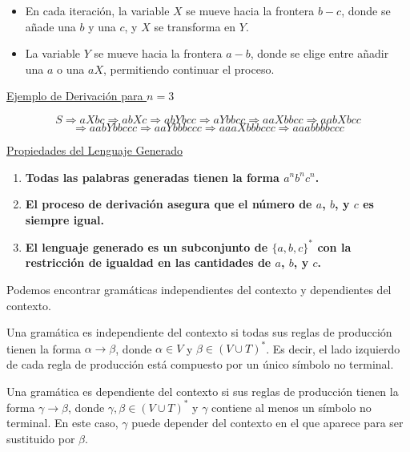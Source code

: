 \documentclass[12pt]{book} %
\providecommand{\tightlist}{%
  \setlength{\itemsep}{0pt}\setlength{\parskip}{0pt}}
\begin{document}
\begin{enumerate}
  \begin{itemize}
  \tightlist
  \item
    En cada iteración, la variable \(X\) se mueve hacia la frontera
    \(b-c\), donde se añade una \(b\) y una \(c\), y \(X\) se transforma
    en \(Y\).\\
  \item
    La variable \(Y\) se mueve hacia la frontera \(a-b\), donde se elige
    entre añadir una \(a\) o una \(aX\), permitiendo continuar el
    proceso.
  \end{itemize}
\end{enumerate}

\underline{Ejemplo de Derivación para $n = 3$}

\[
S \Rightarrow aXbc \Rightarrow abXc \Rightarrow abYbcc \Rightarrow aYbbcc \Rightarrow aaXbbcc \Rightarrow aabXbcc 
\] \[
\Rightarrow aabYbbccc \Rightarrow aaYbbbccc \Rightarrow aaaXbbbccc \Rightarrow aaabbbbccc
\]

\underline{Propiedades del Lenguaje Generado}

\begin{enumerate}
\def\labelenumi{\arabic{enumi}.}
\tightlist
\item
  \textbf{Todas las palabras generadas tienen la forma
  \(a^n b^n c^n\).}\\
\item
  \textbf{El proceso de derivación asegura que el número de \(a\),
  \(b\), y \(c\) es siempre igual.}\\
\item
  \textbf{El lenguaje generado es un subconjunto de \(\{a, b, c\}^*\)
  con la restricción de igualdad en las cantidades de \(a\), \(b\), y
  \(c\).}
\end{enumerate}

Podemos encontrar gramáticas independientes del contexto y dependientes
del contexto.

\begin{definicion}
Una gramática es independiente del contexto si todas sus reglas de producción tienen la forma $\alpha \to \beta$, donde $\alpha \in V$ y $\beta \in (V \cup T)^*$. Es decir, el lado izquierdo de cada regla de producción está compuesto por un único símbolo no terminal.
\end{definicion}

\begin{definicion}
Una gramática es dependiente del contexto si sus reglas de producción tienen la forma $\gamma \to \beta$, donde $\gamma, \beta \in (V \cup T)^*$ y $\gamma$ contiene al menos un símbolo no terminal. En este caso, $\gamma$ puede depender del contexto en el que aparece para ser sustituido por $\beta$.
\end{definicion}
\end{document}
